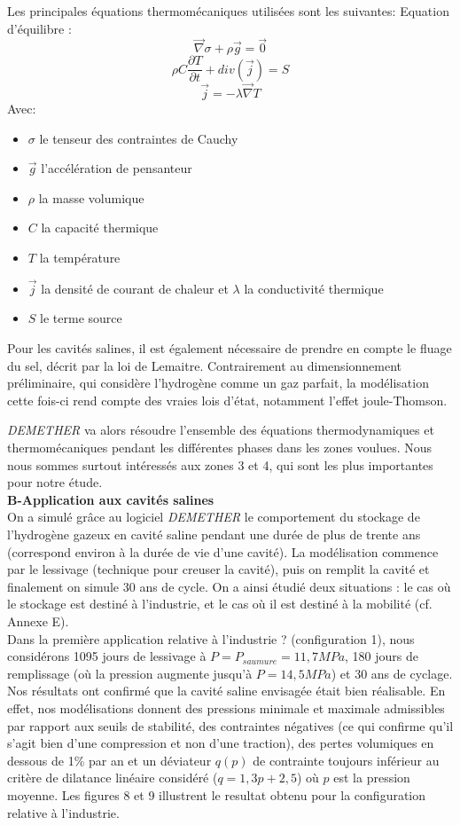 \documentclass[11pt,french,a4paper]{article}
\begin{document}
Les principales équations thermomécaniques utilisées sont les suivantes:  
Equation d'équilibre : $$\vec{\nabla}\sigma + \rho \vec{g} = \vec{0}$$
$$\rho C \frac{\partial T}{\partial t} + div(\vec{j}) = S $$
$$\vec{j} = - \lambda \vec{\nabla}T $$
Avec:
\begin{itemize}
\item $\sigma$ le tenseur des contraintes de Cauchy
\item $\vec{g}$ l'accélération de pensanteur
\item $\rho$ la masse volumique
\item $C$ la capacité thermique 
\item $T$ la température
\item $\vec{j}$  la densité de courant de chaleur et $\lambda$ la conductivité thermique
\item $S$ le terme source
\end{itemize}

Pour les cavités salines, il est également nécessaire de prendre en compte le fluage du sel, décrit par la loi de Lemaitre. Contrairement au dimensionnement préliminaire, qui considère l'hydrogène comme un gaz parfait, la modélisation cette fois-ci rend compte des vraies lois d'état, notamment l'effet joule-Thomson. 

\emph{DEMETHER} va alors résoudre l’ensemble des équations thermodynamiques et thermomécaniques pendant les différentes phases dans les zones voulues. Nous nous sommes surtout intéressés aux zones 3 et 4, qui sont les plus importantes pour notre étude. \\

\textbf{B-Application aux cavités salines}\\

On a simulé grâce au logiciel \emph{DEMETHER} le comportement du stockage de l'hydrogène gazeux en cavité saline pendant une durée de plus de trente ans (correspond environ à la durée de vie d’une cavité). La modélisation commence par le lessivage (technique pour creuser la cavité), puis on remplit la cavité et finalement on simule 30 ans de cycle. On a ainsi étudié deux situations : le cas où le stockage est destiné à l’industrie, et le cas où il est destiné à la mobilité (cf. Annexe E). \\

Dans la première application relative à l'industrie ? (configuration 1), nous considérons 1095 jours de lessivage à $P = P_{saumure} = 11,7 MPa$, 180 jours de remplissage (où la pression augmente jusqu’à $P = 14,5 MPa$) et 30 ans de cyclage. Nos résultats ont confirmé que la cavité saline envisagée était bien réalisable. En effet, nos modélisations donnent des pressions minimale et maximale admissibles par rapport aux seuils de stabilité, des contraintes négatives (ce qui confirme qu'il s'agit bien d'une compression et non d'une traction), des pertes volumiques en dessous de 1\% par an et un déviateur $q(p)$ de contrainte toujours inférieur au critère de dilatance linéaire considéré ($q = 1,3 p + 2,5$) où $p$ est la pression moyenne. Les figures 8 et 9 illustrent le resultat obtenu pour la configuration relative à l'industrie.\\
\end{document}
